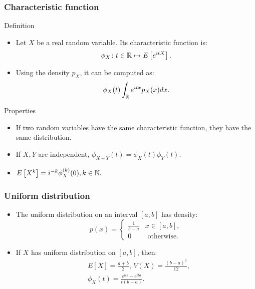 \begin{frame}
    \frametitle{Characteristic function}
    \begin{block}{Definition}
       \begin{itemize}
        \item<+-> Let $X$ be a real random variable. Its characteristic function is:
        \begin{equation}
            \phi_X \colon t \in \mathbb{R} \mapsto E\left[ e^{i t X} \right].
        \end{equation}
        \item<+-> Using the density $p_X$, it can be computed as:
        \begin{equation}
            \phi_X(t)  \int_{\mathbb{R}} e^{i t x} p_X(x) dx.
        \end{equation}
       \end{itemize} 
    \end{block}
    \vskip -24pt
    \begin{block}{Properties}
        \begin{itemize}
            \item<+-> If two random variables have the same characteristic function, they have the same distribution.
            \item<+-> If $X,Y$ are independent, $\phi_{X+Y}(t)=\phi_X(t)\phi_Y(t).$
            \item<+-> $E\left[ X^k \right] = i^{-k} \phi_X^{(k)}(0), k \in \mathbb{N}.$
        \end{itemize}
    \end{block}
\end{frame}
\begin{frame}
    \frametitle{Uniform distribution}
\begin{itemize}
    \item<+-> The uniform distribution on an interval $[a,b]$ has density:
    \begin{equation}
        p(x)= \begin{cases}
            \frac{1}{b-a} & x \in [a,b], \\
            0 & \text{ otherwise.}
        \end{cases}
    \end{equation}
    \item<+-> If $X$ has uniform distribution on $[a,b]$, then:
    \begin{equation}
        \begin{split}
            &E\left[ X \right] = \frac{a+b}{2}, \, V(X) = \frac{(b-a)^2}{12}, \\
            &\phi_X(t) = \frac{e^{itb}-e^{ita}}{t(b-a)}.
        \end{split}
    \end{equation}
\end{itemize}
\end{frame}
